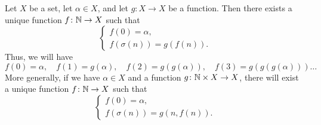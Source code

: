 \begin{theorem}
  \label{th:induzione}%
  Let $X$ be a set, let $\alpha\in X$, and let $g\colon X\to X$ be a function.
  Then there exists a unique function $f\colon {\mathbb N} \to X$ such that
  \begin{equation}\label{eq:4835628}
    \begin{cases}
      f(0) = \alpha, \\
      f(\sigma(n)) = g(f(n)).
    \end{cases}
  \end{equation}
  Thus, we will have
  \[
    f(0) = \alpha,\quad
    f(1) = g(\alpha),\quad
    f(2) = g(g(\alpha)),\quad
    f(3) = g(g(g(\alpha)))\dots
  \]
    More generally, if we have $\alpha\in X$ and a function $g\colon {\mathbb N} \times
  X \to X$,
  there will exist a unique function $f\colon {\mathbb N} \to X$ such that
  \begin{equation}
    \begin{cases}
      f(0) = \alpha, \\
      f(\sigma(n)) = g(n, f(n)).
    \end{cases}
  \end{equation}
\end{theorem}
%
